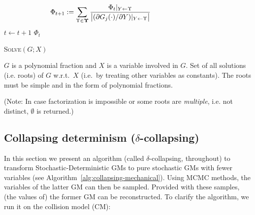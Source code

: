 \documentclass[]{article}
\begin{document}
\begin{algorithm}
\begin{algorithmic}
\begin{equation}
\label{e:core}
\hspace{-28mm}
\Phi_{t + 1} 
:=
\sum_{\Upsilon \in \boldsymbol{\Upsilon}}
\frac{{\Phi_t}|_{Y \leftarrow \Upsilon}}{
\big|(\partial G_j(\cdot) / \partial Y) |_{Y \leftarrow \Upsilon}
\big|
}
\end{equation} \vspace{-4mm}
	\STATE $t \leftarrow t + 1 $	
\ENDFOR
{} $\Phi_t$
\end{algorithmic}
\end{algorithm}
\begin{algorithm}[tb]%
\caption{\textsc{Solve}$(G; X)$    
\label{alg:solve}}
\begin{algorithmic}
\small
{} $G$ is a polynomial fraction and $X$ is a variable involved in $G$.
 Set of all solutions (i.e. roots) of $G$ w.r.t.\ $X$ (i.e.\ by treating other variables as constants). 
The roots must be simple and in the form of polynomial fractions. 

(Note: In case factorization is impossible or some roots are \emph{multiple}, i.e. not distinct, $\emptyset$ is returned.)
\end{algorithmic}
\end{algorithm}
\subsection{Collapsing determinism ($\delta$-collapsing)}%
\label{sect:collapse}
In this section we present an algorithm 
(called $\delta$-collapsing, throughout) 
to transform Stochastic-Deterministic GMs to pure stochastic GMs with fewer variables 
(see Algorithm~\ref{alg:collapsing-mechanical}).
Using MCMC methods, the variables of the latter GM can then be sampled.
Provided with these samples, (the values of) the former GM can be reconstructed. 
To clarify the algorithm, we run it on the collision model (CM): 
\end{document}
